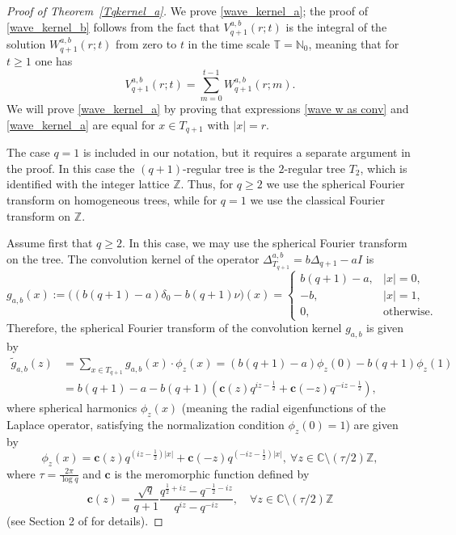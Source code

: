 \documentclass[12pt]{amsart}
\numberwithin{equation}{section}
\theoremstyle{boldremark}
\begin{document}
\begin{proof}[Proof of Theorem~\ref{Tqkernel_a}] 
We prove \eqref{wave_kernel_a}; the proof of \eqref{wave_kernel_b} follows from the fact that
$V_{q+1}^{a,b}(r;t)$ is the integral of the solution $W_{q+1}^{a,b}(r;t)$ from zero to $t$ in the time scale $\mathbb{T}=\mathbb{N}_0$, meaning that for $t\geq 1$ one has
\begin{equation}\label{eq. V as int of W}
    V_{q+1}^{a,b}(r;t)=\sum_{m=0}^{t-1}W_{q+1}^{a,b}(r;m).
\end{equation}
We will prove \eqref{wave_kernel_a} by proving that expressions  \eqref{wave w as conv} and \eqref{wave_kernel_a} are equal for $x\in T_{q+1}$ with $|x|=r$. 

The case $q=1$ is included in our notation, but it requires a separate argument in the proof. In this case the
$(q+1)$-regular tree is the $2$-regular tree $T_2$, which is identified
with the integer lattice $\mathbb Z$. Thus, for $q\geq2$ we use the spherical Fourier transform on homogeneous trees, while for $q=1$ we use the classical Fourier transform on
$\mathbb Z$.

Assume first that $q\ge2$. In this case, we may use the spherical Fourier transform on the tree. The convolution kernel of the operator $\Delta^{a,b}_{T_{q+1}}=b\Delta_{q+1}-aI$ is
$$
g_{a,b}(x):=\big((b(q+1)-a)\delta_0 - b(q+1)\nu\big)(x)
=\begin{cases}
b(q+1)-a, & |x|=0,\\
-b, & |x|=1,\\
0, & \text{otherwise}.
\end{cases}
$$
Therefore,  the spherical Fourier transform of the convolution kernel $g_{a,b}$ is given by
\begin{equation}\label{ft}
\begin{split}
\tilde{g}_{a,b}\left(z\right)&= \sum_{x \in T_{q+1}}g_{a,b}\left(x\right) \cdot \phi_z(x)=(b(q+1)-a)\phi_z(0)- b(q+1)\phi_z(1)\\
&= b(q+1)-a - b(q+1)\left(\boldsymbol{c}(z) q^{iz -\frac{1}{2}} +\boldsymbol{c}(-z) q^{-iz - \frac{1}{2}}\right),
\end{split}
\end{equation}
where spherical harmonics $\phi_z(x)$ (meaning the radial eigenfunctions of the Laplace operator, satisfying the normalization condition $\phi_z(0)=1$) are given by
\[\phi_z(x) =\boldsymbol{c}(z) q^{(iz - \frac{1}{2})|x|} +\boldsymbol{c}(-z) q^{(-iz - \frac{1}{2})|x|}, \  \forall z \in \mathbb{C} \setminus (\tau/2) \mathbb{Z},
\]
where $\tau=\frac{2\pi}{\log{q}}$ and $\boldsymbol{c}$ is the meromorphic function defined by
$$\boldsymbol{c}(z) = \frac{\sqrt{q}}{q+1} \frac{q^{\frac{1}{2} + iz} - q^{-\frac{1}{2} - iz}}{q^{iz} - q^{-iz}}, \quad \forall z \in \mathbb{C} \setminus (\tau/2) \mathbb{Z}$$
(see Section 2 of \cite{MS99} for details).


\end{proof}
\end{document}
